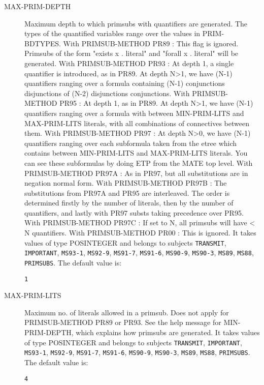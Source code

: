 \begin{description}
\item[MAX-PRIM-DEPTH]  
Maximum depth to which primsubs with quantifiers are generated.
The types of the quantified variables range over the values in PRIM-BDTYPES.
With PRIMSUB-METHOD PR89 : 
 This flag is ignored. Primsubs of the form "exists x . literal" and 
 "forall x . literal" will be generated.
With PRIMSUB-METHOD PR93 :
 At depth 1, a single quantifier is introduced, as in PR89. 
 At depth N>1, we have (N-1) quantifiers ranging over a formula
 containing (N-1) conjunctions {disjunctions} of (N-2) 
 disjunctions {conjunctions}.
With PRIMSUB-METHOD PR95 :
 At depth 1, as in PR89.
 At depth N>1, we have (N-1) quantifiers ranging over a formula
 with between MIN-PRIM-LITS and MAX-PRIM-LITS literals, with
 all combinations of connectives between them.
With PRIMSUB-METHOD PR97 :
 At depth N>0, we have (N-1) quantifiers ranging over each 
 subformula taken from the etree which contains between 
 MIN-PRIM-LITS and MAX-PRIM-LITS literals. You can see these
 subformulas by doing ETP from the MATE top level.
With PRIMSUB-METHOD PR97A :
 As in PR97, but all substitutions are in negation normal form.
With PRIMSUB-METHOD PR97B :
 The substitutions from PR97A and PR95 are interleaved. The order
 is determined firstly by the number of literals, then by the number of
 quantifiers, and lastly with PR97 substs taking precedence over PR95.
With PRIMSUB-METHOD PR97C :
 If set to N, all primsubs will have < N quantifiers.
With PRIMSUB-METHOD PR00  :
 This is ignored.
It takes values of type POSINTEGER and belongs to subjects \texttt{TRANSMIT}, \texttt{IMPORTANT}, \texttt{MS93-1}, \texttt{MS92-9}, \texttt{MS91-7}, \texttt{MS91-6}, \texttt{MS90-9}, \texttt{MS90-3}, \texttt{MS89}, \texttt{MS88}, \texttt{PRIMSUBS}.  The default value is: \begin{lstlisting}
1
\end{lstlisting}

\item[MAX-PRIM-LITS]  
Maximum no. of literals allowed in a primsub.
Does not apply for PRIMSUB-METHOD PR89 or PR93. 
See the help message for MIN-PRIM-DEPTH, which explains how primsubs
are generated.
It takes values of type POSINTEGER and belongs to subjects \texttt{TRANSMIT}, \texttt{IMPORTANT}, \texttt{MS93-1}, \texttt{MS92-9}, \texttt{MS91-7}, \texttt{MS91-6}, \texttt{MS90-9}, \texttt{MS90-3}, \texttt{MS89}, \texttt{MS88}, \texttt{PRIMSUBS}.  The default value is: \begin{lstlisting}
4
\end{lstlisting}


\end{description}
